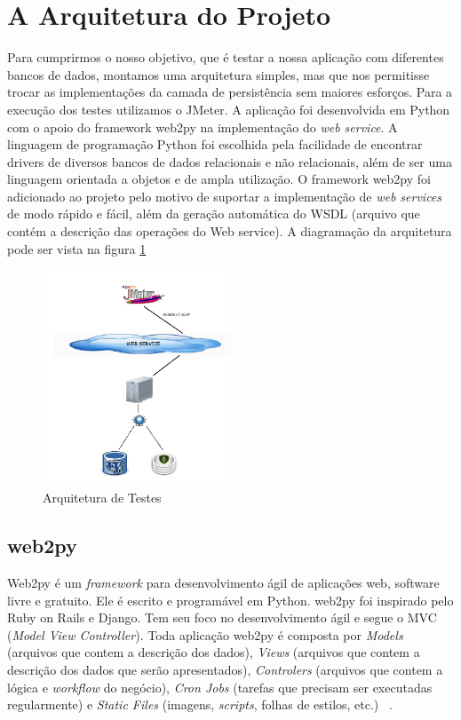 \section{A Arquitetura do Projeto}

Para cumprirmos o nosso objetivo, que é testar a nossa aplicação com diferentes bancos de dados, montamos uma arquitetura simples, mas que nos permitisse trocar as implementações da camada de persistência sem maiores esforços. Para a execução dos testes utilizamos o JMeter. A aplicação foi desenvolvida em Python com o apoio do framework web2py na implementação do \textit{web service}. A linguagem de programação Python foi escolhida pela facilidade de encontrar drivers de diversos bancos de dados relacionais e não relacionais, além de ser uma linguagem orientada a objetos e de ampla utilização. O framework web2py foi adicionado ao projeto pelo motivo de suportar a implementação de \textit{web services} de modo rápido e fácil, além da geração automática do WSDL (arquivo que contém a descrição das operações do Web service). A diagramação da arquitetura pode ser vista na figura \ref{fig:arquitetura}

	\begin{figure}[!htbp]
		\begin{center}
			\includegraphics[width=0.5\textwidth]{arquitetura}
		\end{center}
		\caption{Arquitetura de Testes}
		\label{fig:arquitetura}
	\end{figure}

\subsection{web2py}

Web2py é um \textit{framework} para desenvolvimento ágil de aplicações web, software livre e gratuito. Ele é escrito e programável em Python. web2py foi inspirado pelo Ruby on Rails e Django. Tem seu foco no desenvolvimento ágil e segue o MVC (\textit{Model View Controller}). Toda aplicação web2py é composta por \textit{Models} (arquivos que contem a descrição dos dados), \textit{Views} (arquivos que contem a descrição dos dados que serão apresentados), \textit{Controlers} (arquivos que contem a lógica e \textit{workflow} do negócio), \textit{Cron Jobs} (tarefas que precisam ser executadas regularmente) e \textit{Static Files} (imagens, \textit{scripts}, folhas de estilos, etc.) ~\cite{siteweb2py}.

